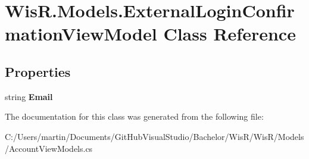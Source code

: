 \hypertarget{class_wis_r_1_1_models_1_1_external_login_confirmation_view_model}{}\section{Wis\+R.\+Models.\+External\+Login\+Confirmation\+View\+Model Class Reference}
\label{class_wis_r_1_1_models_1_1_external_login_confirmation_view_model}
\subsection*{Properties}
\begin{DoxyCompactItemize}
\item 
\hypertarget{class_wis_r_1_1_models_1_1_external_login_confirmation_view_model_afb21d6fe1dec9e44f47d01573acfa9b7}{}string {\bfseries Email}\label{class_wis_r_1_1_models_1_1_external_login_confirmation_view_model_afb21d6fe1dec9e44f47d01573acfa9b7}

\end{DoxyCompactItemize}


The documentation for this class was generated from the following file\+:\begin{DoxyCompactItemize}
\item 
C\+:/\+Users/martin/\+Documents/\+Git\+Hub\+Visual\+Studio/\+Bachelor/\+Wis\+R/\+Wis\+R/\+Models/Account\+View\+Models.\+cs\end{DoxyCompactItemize}
